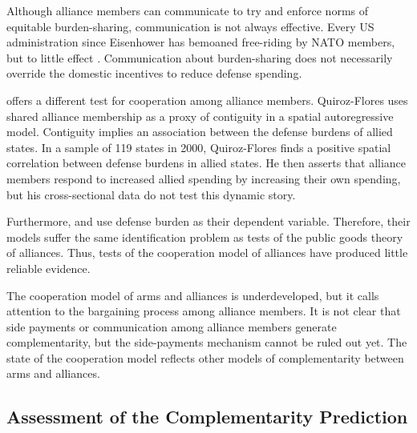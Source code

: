 \documentclass[12pt]{article}
\begin{document}
Although alliance members can communicate to try and enforce norms of equitable burden-sharing, communication is not always effective.  
Every US administration since Eisenhower has bemoaned free-riding by NATO members, but to little effect \citep{Lanoszka2015}. 
Communication about burden-sharing does not necessarily override the domestic incentives to reduce defense spending. 


\citet{QuirozFlores2011} offers a different test for cooperation among alliance members. 
Quiroz-Flores uses shared alliance membership as a proxy of contiguity in a spatial autoregressive model.
Contiguity implies an association between the defense burdens of allied states. 
In a sample of 119 states in 2000, Quiroz-Flores finds a positive spatial correlation between defense burdens in allied states. 
He then asserts that alliance members respond to increased allied spending by increasing their own spending, but his cross-sectional data do not test this dynamic story.


Furthermore, \citet{Palmer1990} and \citet{QuirozFlores2011} use defense burden as their dependent variable.
Therefore, their models suffer the same identification problem as tests of the public goods theory of alliances. 
Thus, tests of the cooperation model of alliances have produced little reliable evidence. 


The cooperation model of arms and alliances is underdeveloped, but it calls attention to the bargaining process among alliance members. 
It is not clear that side payments or communication among alliance members generate complementarity, but the side-payments mechanism cannot be ruled out yet. 
The state of the cooperation model reflects other models of complementarity between arms and alliances.  



\subsection{Assessment of the Complementarity Prediction} 








\end{document}
